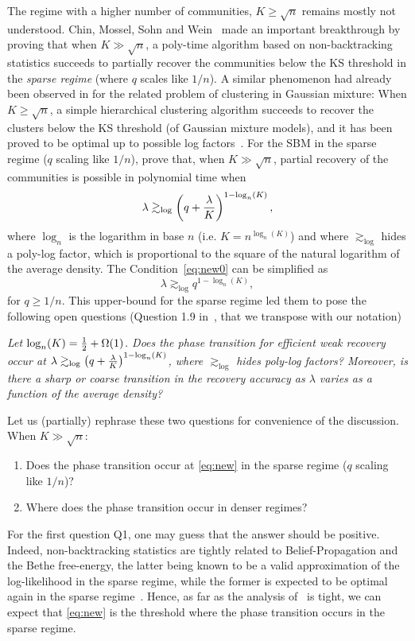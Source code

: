 \documentclass[final]{colt2026}
\newcommand{\1}{\mathbf{1}}
\newcommand{\pa}[1]{\left(#1\right)}
\begin{document}
The regime with a higher number of communities, $K\geq \sqrt{n}$ remains mostly not understood. Chin, Mossel, Sohn and Wein~\cite{pmlr-v291-chin25a} made an important breakthrough by proving that when $K\gg \sqrt{n}$, a poly-time algorithm based on non-backtracking statistics  succeeds to partially recover the communities below the KS threshold in the \emph{sparse regime} (where $q$ scales like $1/n$). A similar phenomenon had  already been observed in \cite{Even24} for the related problem of clustering in Gaussian mixture: When $K\geq \sqrt{n}$, a simple hierarchical clustering algorithm succeeds to recover the clusters below the KS threshold (of Gaussian mixture models), and it has been proved to be optimal  up to possible log factors~\cite{Even24,Even25a}.  For the SBM in the sparse regime  ($q$ scaling like $1/n$), \cite{pmlr-v291-chin25a} prove that, when $K\gg \sqrt{n}$, partial recovery of the communities is possible in polynomial time when
\begin{equation}\label{eq:new0}
\lambda \gtrsim_{\log} \pa{q+{\lambda \over K}}^{1-\log_{n}(K)},
\end{equation}
where $\log_{n}$ is the logarithm in base $n$ (i.e. $K=n^{\log_{n}(K)}$) and where $\gtrsim_{\log}$ hides a poly-log factor, which is proportional to the square of the natural logarithm of the average density. The Condition~\eqref{eq:new0} can be simplified as
\begin{equation}\label{eq:new}
\lambda \gtrsim_{\log} q^{1-\log_{n}(K)},
\end{equation}
for $q\geq 1/n$.
This upper-bound for the sparse regime led them to pose the following open questions (Question 1.9 in~\cite{pmlr-v291-chin25a}, that we transpose with our notation)
\begin{center}
{\it Let $\log_{n}(K)={1\over 2}+\Omega(1)$. Does the phase transition for efficient weak
recovery occur at $\lambda \gtrsim_{\log} \pa{q+{\lambda \over K}}^{1-\log_{n}(K)}$, where $\gtrsim_{\log}$  hides poly-log factors? Moreover, is there a sharp or coarse
transition in the recovery accuracy as $\lambda$ varies as a function of the average density?}
\end{center}
Let us (partially) rephrase these two questions for convenience of the discussion. When $K\gg \sqrt{n}$:
\begin{enumerate}\setlength{\itemsep}{0pt}
\item[Q1:]  Does the phase transition occur at \eqref{eq:new} in the sparse regime ($q$ scaling like $1/n$)?
\item[Q2:] Where does the phase transition occur in denser regimes?
\end{enumerate}
For the first question Q1, one may guess that the answer should be positive. Indeed,  non-backtracking statistics are tightly related to Belief-Propagation and the Bethe free-energy, the latter being known to be a valid approximation of the log-likelihood in the sparse regime, while the former is expected to be optimal again in the sparse regime~\cite{krzakala2013spectral,Moore2017}. Hence, as far as the analysis of~\cite{pmlr-v291-chin25a} is tight, we can expect that \eqref{eq:new} is the threshold where the phase transition occurs in the sparse regime. 
\end{document}
